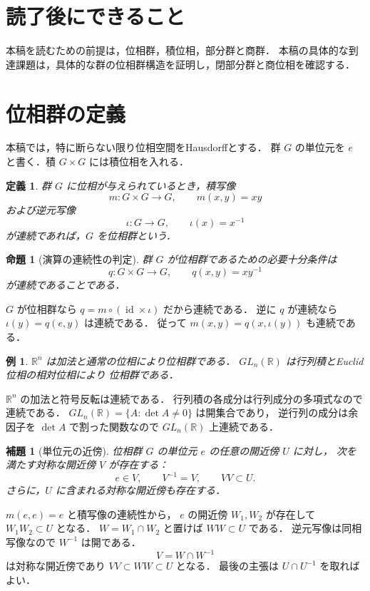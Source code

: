 \documentclass[a5paper,10pt,onecolumn]{jsarticle}
\makeatletter
\theoremstyle{mathnotetheorem}
\newtheorem{definition}[theorem]{定義}
\newtheorem{lemma}[theorem]{補題}
\newtheorem{proposition}[theorem]{命題}
\newtheorem{example}[theorem]{例}
\renewcommand{\proofname}{証明}
\renewenvironment{proof}[1][\proofname]{%
  \par\pushQED{\qed}\normalfont\topsep4\p@\@plus2\p@\relax
  \trivlist\item[\hskip\labelsep\bfseries #1]\ignorespaces
}{\popQED\endtrivlist\@endpefalse}
\makeatother
\begin{document}
\section*{読了後にできること}
本稿を読むための前提は，位相群，積位相，部分群と商群．
本稿の具体的な到達課題は，具体的な群の位相群構造を証明し，閉部分群と商位相を確認する．


\section{位相群の定義}

本稿では，特に断らない限り位相空間をHausdorffとする．
群 $G$ の単位元を $e$ と書く．積 $G\times G$ には積位相を入れる．

\begin{definition}
群 $G$ に位相が与えられているとき，積写像
\[
 m:G\times G\longrightarrow G,\qquad m(x,y)=xy
\]
および逆元写像
\[
 \iota:G\longrightarrow G,\qquad \iota(x)=x^{-1}
\]
が連続であれば，$G$ を\emph{位相群}という．
\end{definition}

\begin{proposition}[演算の連続性の判定]\label{prop:single}
群 $G$ が位相群であるための必要十分条件は
\[
 q:G\times G\longrightarrow G,\qquad
 q(x,y)=xy^{-1}
\]
が連続であることである．
\end{proposition}
\begin{proof}
$G$ が位相群なら $q=m\circ(\operatorname{id}\times\iota)$
だから連続である．
逆に $q$ が連続なら
$\iota(y)=q(e,y)$ は連続である．
従って $m(x,y)=q(x,\iota(y))$ も連続である．
\end{proof}

\begin{example}
$\mathbb R^n$ は加法と通常の位相により位相群である．
$GL_n(\mathbb R)$ は行列積とEuclid位相の相対位相により
位相群である．
\end{example}
\begin{proof}
$\mathbb R^n$ の加法と符号反転は連続である．
行列積の各成分は行列成分の多項式なので連続である．
$GL_n(\mathbb R)=\{A:\det A\ne0\}$ は開集合であり，
逆行列の成分は余因子を $\det A$ で割った関数なので
$GL_n(\mathbb R)$ 上連続である．
\end{proof}

\begin{lemma}[単位元の近傍]\label{lem:nbhd}
位相群 $G$ の単位元 $e$ の任意の開近傍 $U$ に対し，
次を満たす対称な開近傍 $V$ が存在する：
\[
 e\in V,\qquad V^{-1}=V,\qquad VV\subset U.
\]
さらに，$U$ に含まれる対称な開近傍も存在する．
\end{lemma}
\begin{proof}
$m(e,e)=e$ と積写像の連続性から，
$e$ の開近傍 $W_1,W_2$ が存在して
$W_1W_2\subset U$ となる．
$W=W_1\cap W_2$ と置けば $WW\subset U$ である．
逆元写像は同相写像なので $W^{-1}$ は開である．
\[
 V=W\cap W^{-1}
\]
は対称な開近傍であり $VV\subset WW\subset U$ となる．
最後の主張は $U\cap U^{-1}$ を取ればよい．
\end{proof}
\end{document}
